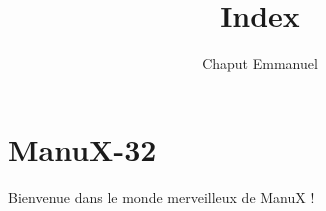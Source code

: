\documentclass{article}
\title{Index}
\author{Chaput Emmanuel}
\begin{document}
%
\section{ManuX-32}

   Bienvenue dans le monde merveilleux de ManuX ! 
\end{document}
